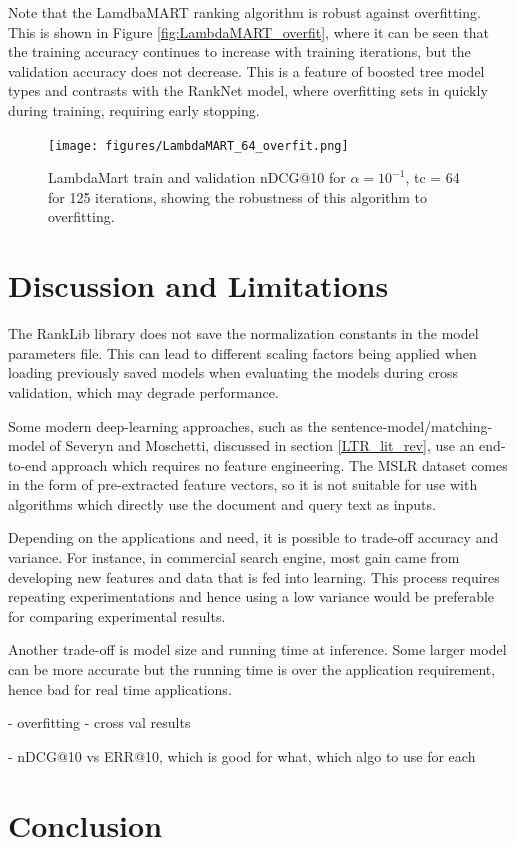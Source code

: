 \documentclass[english]{article}
\theoremstyle{definition}
\begin{document}
\begin{multicols}{2}
Note that the LamdbaMART ranking algorithm is robust against overfitting.  This is shown in Figure \ref{fig:LambdaMART_overfit}, where it can be seen that the training accuracy continues to increase with training iterations, but the validation accuracy does not decrease.  This is a feature of boosted tree model types and contrasts with the RankNet model, where overfitting sets in quickly during training, requiring early stopping.

\begin{figure}[H]
\texttt{[image: figures/LambdaMART\_64\_overfit.png]}
\caption{LambdaMart train and validation nDCG@10 for $\alpha=10^{-1}$, tc = 64 for 125 iterations, showing the robustness of this algorithm to overfitting.} \label{fig:LambdaMART_overfit}
\label{LambdaMART_lc}
\end{figure}

\section{Discussion and Limitations}

The RankLib library does not save the normalization constants in the model parameters file.  This can lead to different scaling factors being applied when loading previously saved models when evaluating the models during cross validation, which may degrade performance.  

Some modern deep-learning approaches, such as the sentence-model/matching-model of Severyn and Moschetti, discussed in section \ref{LTR_lit_rev}, use an end-to-end approach which requires no feature engineering.  The MSLR dataset comes in the form of pre-extracted feature vectors, so it is not suitable for use with algorithms which directly use the document and query text as inputs.

Depending on the applications and need, it is possible to trade-off accuracy and variance. For instance, in commercial search engine, most gain came from developing new features and data that is fed into learning. This process requires repeating experimentations and hence using a low variance would be preferable for comparing experimental results. 

Another trade-off is model size and running time at inference. Some larger model can be more accurate but the running time is over the application requirement, hence bad for real time applications.  


- overfitting - cross val results

- nDCG@10 vs ERR@10, which is good for what, which algo to use for each

\section{Conclusion}




\newpage
\medskip



\end{multicols}
\end{document}
